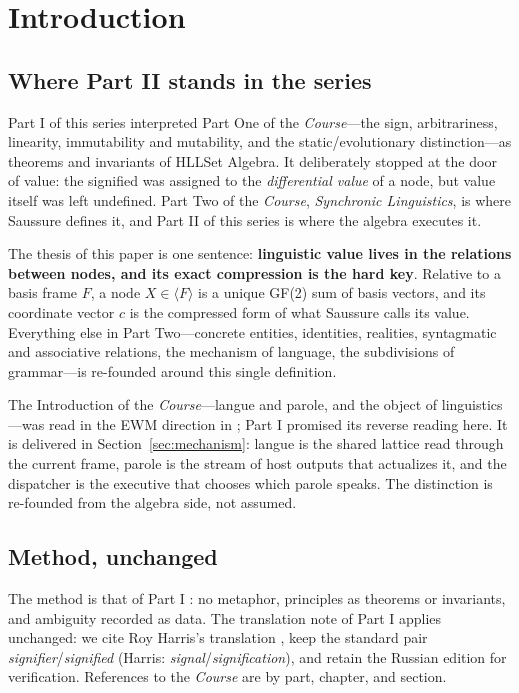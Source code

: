 \documentclass[11pt,a4paper]{article}
\theoremstyle{remark}
\newcommand{\spanof}[1]{\ensuremath{\langle #1\rangle}}  %
\begin{document}
\section{Introduction}
\label{sec:intro}

\subsection{Where Part II stands in the series}

Part I of this series \cite{part1} interpreted Part One of the
\textit{Course}---the sign, arbitrariness, linearity, immutability and
mutability, and the static/evolutionary distinction---as theorems and
invariants of HLLSet Algebra. It deliberately stopped at the door of
value: the signified was assigned to the \emph{differential value} of a node,
but value itself was left undefined. Part Two of the \textit{Course},
\emph{Synchronic Linguistics}, is where Saussure defines it, and Part II of
this series is where the algebra executes it.

The thesis of this paper is one sentence: \textbf{linguistic value lives in
the relations between nodes, and its exact compression is the hard key}.
Relative to a basis frame $F$, a node $X \in \spanof{F}$ is a unique GF(2)
sum of basis vectors, and its coordinate vector $c$ is the compressed form of
what Saussure calls its value. Everything else in Part Two---concrete
entities, identities, realities, syntagmatic and associative relations, the
mechanism of language, the subdivisions of grammar---is re-founded around
this single definition.

The Introduction of the \textit{Course}---langue and parole, and the object
of linguistics---was read in the EWM direction in \cite{langue2026}; Part I
promised its reverse reading here. It is delivered in
Section~\ref{sec:mechanism}: langue is the shared lattice read through the
current frame, parole is the stream of host outputs that actualizes it, and
the dispatcher is the executive that chooses which parole speaks. The
distinction is re-founded from the algebra side, not assumed.

\subsection{Method, unchanged}

The method is that of Part I \cite{part1}: no metaphor, principles as theorems
or invariants, and ambiguity recorded as data. The translation note of Part I
applies unchanged: we cite Roy Harris's translation \cite{harris1983}, keep
the standard pair \emph{signifier}/\emph{signified} (Harris:
\emph{signal}/\emph{signification}), and retain the Russian edition
\cite{saussure1977} for verification. References to the \textit{Course} are by
part, chapter, and section.
\end{document}
